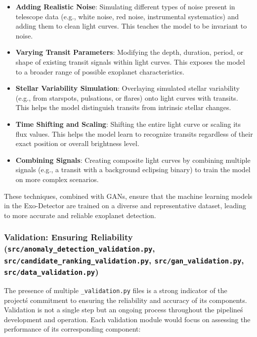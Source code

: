 \documentclass{article}
\begin{document}
\begin{itemize}
    \item \textbf{Adding Realistic Noise}: Simulating different types of noise present in telescope data (e.g., white noise, red noise, instrumental systematics) and adding them to clean light curves. This teaches the model to be invariant to noise.
    \item \textbf{Varying Transit Parameters}: Modifying the depth, duration, period, or shape of existing transit signals within light curves. This exposes the model to a broader range of possible exoplanet characteristics.
    \item \textbf{Stellar Variability Simulation}: Overlaying simulated stellar variability (e.g., from starspots, pulsations, or flares) onto light curves with transits. This helps the model distinguish transits from intrinsic stellar changes.
    \item \textbf{Time Shifting and Scaling}: Shifting the entire light curve or scaling its flux values. This helps the model learn to recognize transits regardless of their exact position or overall brightness level.
    \item \textbf{Combining Signals}: Creating composite light curves by combining multiple signals (e.g., a transit with a background eclipsing binary) to train the model on more complex scenarios.
\end{itemize}

These techniques, combined with GANs, ensure that the machine learning models in the Exo-Detector are trained on a diverse and representative dataset, leading to more accurate and reliable exoplanet detection.

\subsubsection{Validation: Ensuring Reliability (\texttt{src/anomaly\_detection\_validation.py}, \texttt{src/candidate\_ranking\_validation.py}, \texttt{src/gan\_validation.py}, \texttt{src/data\_validation.py})}

The presence of multiple \texttt{\_validation.py} files is a strong indicator of the project\'s commitment to ensuring the reliability and accuracy of its components. Validation is not a single step but an ongoing process throughout the pipeline\'s development and operation. Each validation module would focus on assessing the performance of its corresponding component:
\end{document}
